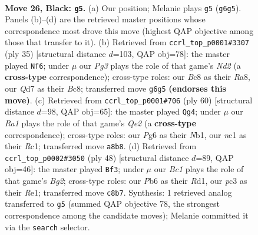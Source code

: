 \documentclass[11pt]{article}
\begin{document}
\clearpage

\begin{figure}[p]\centering
\begin{subfigure}{0.46\textwidth}\centering
\resizebox{\linewidth}{!}{%
\newchessgame
\chessboard[
  setfen={r1b1rk2/3q3p/ppn2Pp1/2p1p3/P1Q5/2P2P2/6PP/1KN1RBNR b - - 1 26},
  showmover=false,
  pgfstyle=straightmove, color=movearrow, markmove={g6-g5}
]}
\caption{}
\end{subfigure}\hfill
\begin{subfigure}{0.46\textwidth}\centering
\resizebox{\linewidth}{!}{%
\newchessgame
\chessboard[
  setfen={r1b1r1k1/1p1nqpp1/2p4p/8/p1QPp3/P3P3/1P1NBPPP/2R1R1K1 b - - 1 18},
  showmover=false,
  pgfstyle=straightmove, color=movearrow, markmove={d7-f6}
]}
\caption{}
\end{subfigure}
\\[4pt]
\begin{subfigure}{0.46\textwidth}\centering
\resizebox{\linewidth}{!}{%
\newchessgame
\chessboard[
  setfen={r1r3k1/3nb1p1/2p1p2p/3pP3/pq1P4/6BP/PPR1Q1P1/1NR3K1 w - - 0 31},
  showmover=false,
  pgfstyle=straightmove, color=movearrow, markmove={e2-g4}
]}
\caption{}
\end{subfigure}\hfill
\begin{subfigure}{0.46\textwidth}\centering
\resizebox{\linewidth}{!}{%
\newchessgame
\chessboard[
  setfen={1n2r1k1/4qpp1/2rp4/p6p/Np2PPnP/1P1Q2P1/P5B1/3RR1K1 w - - 2 25},
  showmover=false,
  pgfstyle=straightmove, color=movearrow, markmove={g2-f3}
]}
\caption{}
\end{subfigure}
\caption{\textbf{Move 26, Black: \texttt{g5}.} (a) Our position; Melanie plays \texttt{g5} (\texttt{g6g5}). Panels (b)--(d) are the retrieved master positions whose correspondence most drove this move (highest QAP objective among those that transfer to it). (b) Retrieved from \texttt{ccrl\_top\_p0001\#3307} (ply 35) [structural distance $d$=103, QAP obj=78]: the master played \texttt{Nf6}; under $\mu$ our \emph{Pg3} plays the role of that game's \emph{Nd2} (a \textbf{cross-type} correspondence); cross-type roles: our \emph{B}c8 as their \emph{R}a8, our \emph{Q}d7 as their \emph{B}c8; transferred move \texttt{g6g5} \textbf{(endorses this move)}. (c) Retrieved from \texttt{ccrl\_top\_p0001\#706} (ply 60) [structural distance $d$=98, QAP obj=65]: the master played \texttt{Qg4}; under $\mu$ our \emph{Ra1} plays the role of that game's \emph{Qe2} (a \textbf{cross-type} correspondence); cross-type roles: our \emph{P}g6 as their \emph{N}b1, our \emph{n}c1 as their \emph{R}c1; transferred move \texttt{a8b8}. (d) Retrieved from \texttt{ccrl\_top\_p0002\#3050} (ply 48) [structural distance $d$=89, QAP obj=46]: the master played \texttt{Bf3}; under $\mu$ our \emph{Bc1} plays the role of that game's \emph{Bg2}; cross-type roles: our \emph{P}b6 as their \emph{R}d1, our \emph{p}c3 as their \emph{R}e1; transferred move \texttt{c8b7}. Synthesis: 1 retrieved analog transferred to \texttt{g5} (summed QAP objective 78, the strongest correspondence among the candidate moves); Melanie committed it via the \texttt{search} selector.}
\label{fig:thought-m51}
\end{figure}
\end{document}
